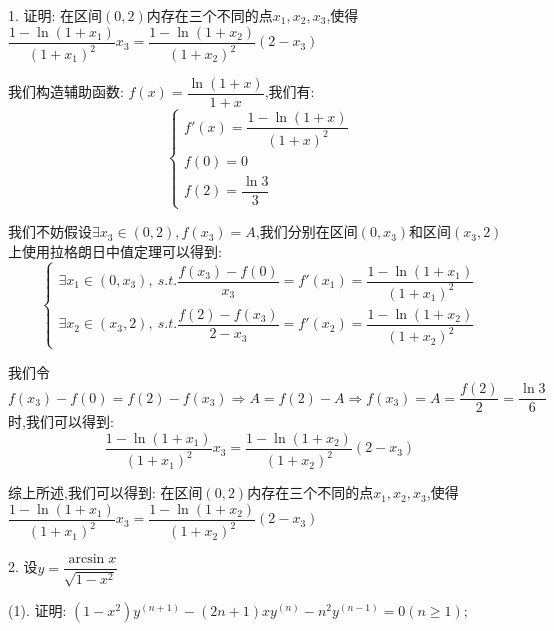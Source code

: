 1. 证明:  在区间$(0,2)$内存在三个不同的点$x_{1},x_{2},x_{3}$,使得$\dfrac{1-\ln(1+x_{1})}{(1+x_{1})^2}x_{3}=\dfrac{1-\ln(1+x_{2})}{(1+x_{2})^2}(2-x_{3})$
\begin{solution}

	我们构造辅助函数:  $f(x)=\dfrac{\ln(1+x)}{1+x}$,我们有:  
	$$\left\lbrace 
	\begin{array}{l}
		f'(x)=\dfrac{1-\ln(1+x)}{(1+x)^2}\\
		f(0)=0\\
		f(2)=\dfrac{\ln 3}{3}
	\end{array}
	\right. $$
	
	我们不妨假设$\exists x_{3}\in(0,2), f(x_{3})=A$,我们分别在区间$(0,x_{3})$和区间$(x_{3},2)$上使用拉格朗日中值定理可以得到:  
	$$\left\lbrace 
	\begin{array}{l}
		\exists x_{1}\in(0,x_{3}),\ s.t. \dfrac{f(x_{3})-f(0)}{x_{3}}=f'(x_{1})=\dfrac{1-\ln(1+x_{1})}{(1+x_{1})^2}\\
		\exists x_{2}\in(x_{3},2),\ s.t. \dfrac{f(2)-f(x_{3})}{2-x_{3}}=f'(x_{2})=\dfrac{1-\ln(1+x_{2})}{(1+x_{2})^2}
	\end{array}
	\right. $$
	
	我们令$f(x_{3})-f(0)=f(2)-f(x_{3})\Rightarrow A=f(2)-A\Rightarrow f(x_{3})=A=\dfrac{f(2)}{2}=\dfrac{\ln 3}{6}$时,我们可以得到:  $$\dfrac{1-\ln(1+x_{1})}{(1+x_{1})^2}x_{3}=\dfrac{1-\ln(1+x_{2})}{(1+x_{2})^2}(2-x_{3})$$
	
	综上所述,我们可以得到:  在区间$(0,2)$内存在三个不同的点$x_{1},x_{2},x_{3}$,使得$\dfrac{1-\ln(1+x_{1})}{(1+x_{1})^2}x_{3}=\dfrac{1-\ln(1+x_{2})}{(1+x_{2})^2}(2-x_{3})$
\end{solution}

2. 设$y=\dfrac{\arcsin x}{\sqrt{1-x^2}}$

(1). 证明:  $(1-x^2)y^{(n+1)}-(2n+1)xy^{(n)}-n^2y^{(n-1)}=0(n\geq 1)$;

